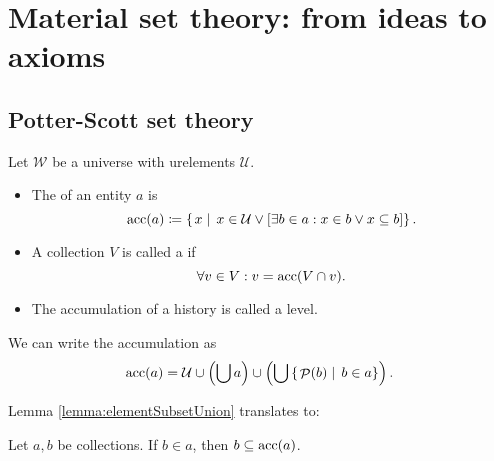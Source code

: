 \chapter{Material set theory: from ideas to axioms}

\section{Potter-Scott set theory}
\begin{definition}
Let $\mathcal{W}$ be a universe with urelements $\mathcal{U}$.
\begin{itemize}
\item The  of an entity $a$ is
\[ \operatorname{acc}(a) \coloneqq \left\{\left. x \;\right|\; x\in \mathcal{U} \lor \left[\exists b\in a: x\in b \lor x\subseteq b\right] \right\}. \]
\item A collection $V$ is called a  if
\[ \forall v\in V: v = \operatorname{acc}(V\cap v). \]
\item The accumulation of a history is called a level.
\end{itemize}
\end{definition}

We can write the accumulation as
\[ \operatorname{acc}(a) = \mathcal{U}\cup \left(\bigcup a\right) \cup \left(\bigcup\left\{\left. \mathop{\mathcal{P}}(b) \;\right|\; b\in a \right\}\right). \]

Lemma \ref{lemma:elementSubsetUnion} translates to:
\begin{lemma} \label{lemma:elementsSubsetAccumulation}
Let $a,b$ be collections. If $b\in a$, then $b\subseteq \operatorname{acc}(a)$.
\end{lemma}

